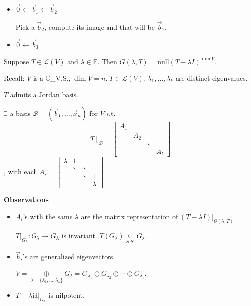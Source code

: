 \documentclass[11pt,fleqn]{book} %
\begin{document}
\begin{example}
    \begin{itemize}
        \item $\vec{0} \leftarrow \vec{b}_1 \leftarrow \vec{b}_2$
            
        Pick a $\vec{b}_2$, compute its image and that will be $\vec{b}_1$. 
            
        \item $\vec{0} \leftarrow \vec{b}_3$
    \end{itemize}
\end{example}

\begin{lemma}
    Suppose $T \in \mathcal{L}(V)$ and $\lambda \in \mathbb{F}$. Then $G(\lambda, T) = \mathrm{null}(T - \lambda I)^{\dim V}$. 
\end{lemma}

Recall: $V$ is a $\mathbb{C}$\_V.S., $\dim V = n$. $T \in \mathcal{L}(V)$. $\lambda_1, \dots, \lambda_k$ are distinct eigenvalues. 
\begin{theorem}
    $T$ admits a Jordan basis. 
     
    $\exists$ a basis $\mathcal{B} = (\vec{b}_1, \dots, \vec{x}_n)$ for $V$ s.t. $$[T]_\mathcal{B} = \begin{bmatrix} A_1 \\ &A_2 \\ & &\ddots \\ & & &A_l \end{bmatrix}$$, with each $A_{i} = \begin{bmatrix} \lambda &1 \\ &\ddots &\ddots \\ & & \ddots &1 \\ & & & \lambda \end{bmatrix}$
\end{theorem}
 
\textbf{Observations}
\begin{itemize}
    \item $A_i$'s with the same $\lambda$ are the matrix representation of $(T - \lambda I)\big|_{G(\lambda, T)}$. 
     
    $T\big|_{G_\lambda}: G_\lambda \to G_\lambda$ is invariant. $T(G_\lambda) \underset{S.S.}{\subseteq} G_\lambda$. 
     
    \item $\vec{b}_i$'s are generalized eigenvectors. 
    
    $V = \underset{\lambda = \{ \lambda_1, \dots, \lambda_k \}}{\oplus} G_{\lambda} = G_{\lambda_1} \oplus G_{\lambda_2} \oplus \cdots \oplus G_{\lambda_k}$. 
    
    \item $T - \lambda\mathrm{id} \big|_{G_\lambda}$ is nilpotent. 
\end{itemize}
 
\end{document}
